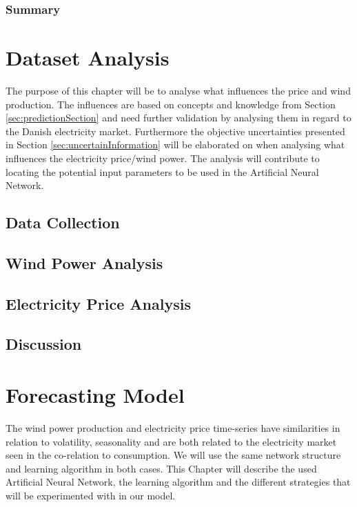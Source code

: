 \documentclass[twoside,11pt,openright]{report}
\begin{document}
\subsection{Summary}



\chapter{Dataset Analysis}
\label{ch:theANNs}
The purpose of this chapter will be to analyse what influences the price and wind production. The influences are based on concepts and knowledge from Section \ref{sec:predictionSection} and need further validation by analysing them in regard to the Danish electricity market. Furthermore the objective uncertainties presented in Section \ref{sec:uncertainInformation} will be elaborated on when analysing what influences the electricity price/wind power. The analysis will contribute to locating the potential input parameters to be used in the Artificial Neural Network.
\section{Data Collection}
\label{sec:dataCollection}

\newpage
\section{Wind Power Analysis}
\label{sec:windPowerAnalysis}

\newpage
\section{Electricity Price Analysis}
\label{sec:ElectricityPriceAnalysis}

\section{Discussion}



\chapter{Forecasting Model}
\label{ch:forecastingModel}
The wind power production and electricity price time-series have similarities in relation to volatility, seasonality and are both related to the electricity market seen in the co-relation to consumption. We will use the same network structure and learning algorithm in both cases. This Chapter will describe the used Artificial Neural Network, the learning algorithm and the different strategies that will be experimented with in our model.





\end{document}
